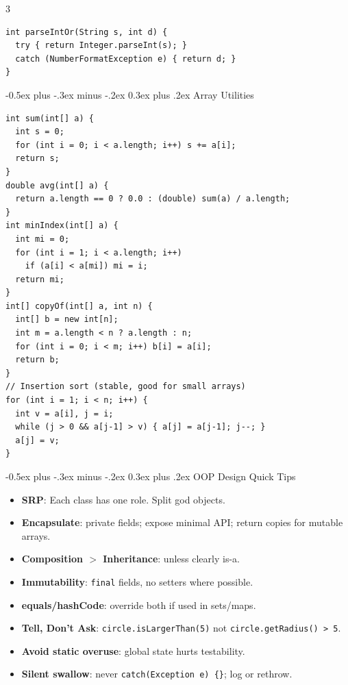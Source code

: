 \documentclass[10pt]{article}
\makeatletter
\renewcommand{\section}{\@startsection{section}{1}{0mm}%
                                {-0.5ex plus -.3ex minus -.2ex}%
                                {0.3ex plus .2ex}%
                                {\normalfont\large\bfseries}}
\makeatother
\begin{document}
\begin{multicols}{3}
\begin{verbatim}
int parseIntOr(String s, int d) {
  try { return Integer.parseInt(s); }
  catch (NumberFormatException e) { return d; }
}
\end{verbatim}

\section{Array Utilities}
\begin{verbatim}
int sum(int[] a) {
  int s = 0;
  for (int i = 0; i < a.length; i++) s += a[i];
  return s;
}
double avg(int[] a) {
  return a.length == 0 ? 0.0 : (double) sum(a) / a.length;
}
int minIndex(int[] a) {
  int mi = 0;
  for (int i = 1; i < a.length; i++)
    if (a[i] < a[mi]) mi = i;
  return mi;
}
int[] copyOf(int[] a, int n) {
  int[] b = new int[n];
  int m = a.length < n ? a.length : n;
  for (int i = 0; i < m; i++) b[i] = a[i];
  return b;
}
// Insertion sort (stable, good for small arrays)
for (int i = 1; i < n; i++) {
  int v = a[i], j = i;
  while (j > 0 && a[j-1] > v) { a[j] = a[j-1]; j--; }
  a[j] = v;
}
\end{verbatim}

\section{OOP Design Quick Tips}
\begin{itemize}
  \item \textbf{SRP}: Each class has one role. Split god objects.
  \item \textbf{Encapsulate}: private fields; expose minimal API; return copies for mutable arrays.
  \item \textbf{Composition $>$ Inheritance}: unless clearly is-a.
  \item \textbf{Immutability}: \texttt{final} fields, no setters where possible.
  \item \textbf{equals/hashCode}: override both if used in sets/maps.
  \item \textbf{Tell, Don't Ask}: \texttt{circle.isLargerThan(5)} not \texttt{circle.getRadius() > 5}.
  \item \textbf{Avoid static overuse}: global state hurts testability.
  \item \textbf{Silent swallow}: never \texttt{catch(Exception e) \{\}}; log or rethrow.
\end{itemize}


\end{multicols}
\end{document}

